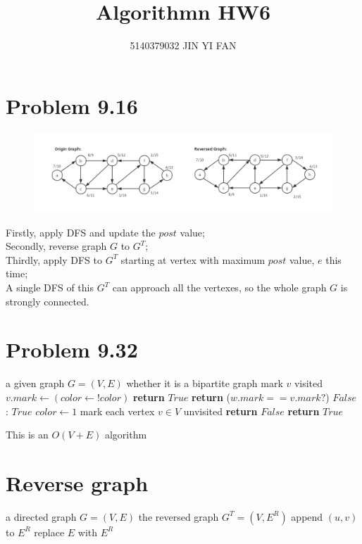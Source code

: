 \documentclass[a4paper]{article}
\title{\textbf{Algorithmn HW6}}
\author{5140379032 JIN YI FAN}
\date{}
\begin{document}
\maketitle
\begin{spacing}{1.3}
\section*{Problem 9.16}
\begin{figure}[H]
    \centering
    \includegraphics[width=15cm]{graph.png}
\end{figure}
Firstly, apply DFS and update the $post$ value;
\\Secondly, reverse graph $G$ to $G^T$;
\\Thirdly, apply DFS to $G^T$ starting at vertex with maximum $post$ value, $e$ this time;
\\A single DFS of this $G^T$ can approach all the vertexes, so the whole graph $G$ is strongly connected.
\section*{Problem 9.32}
\begin{algorithmic}[1]
\Require a given graph $G=(V,E)$
\Ensure whether it is a bipartite graph
\State mark $v$ visited
\State $v.mark\gets (color\gets !color)$
\State {}
\State \textbf{return} $True$
\Else \State \textbf{return} ($w.mark==v.mark?$) $False$ : $True$
\EndIf
\EndFor
\EndFunction
\State $color\gets 1$
\State mark each vertex $v\in V$ unvisited
\State \textbf{return} $False$
\EndIf
\EndFor
\State \textbf{return} $True$
\end{algorithmic}
This is an $O(V+E)$ algorithm

\section*{Reverse graph}
\begin{algorithmic}[1]
\Require a directed graph $G=(V,E)$
\Ensure the reversed graph $G^T=(V,E^R)$
\State append $(u,v)$ to $E^R$
\EndFor
\State replace $E$ with $E^R$
\end{algorithmic}


\end{spacing}
\end{document}

